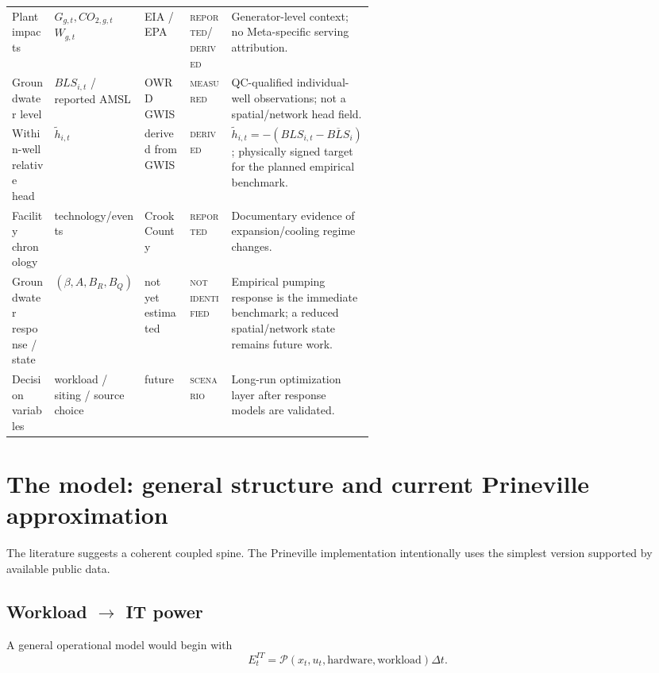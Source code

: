 \documentclass[11pt]{article}
\newcommand{\Reported}{\textsc{reported}}
\newcommand{\Measured}{\textsc{measured}}
\newcommand{\Derived}{\textsc{derived}}
\newcommand{\Scenario}{\textsc{scenario}}
\newcommand{\NotIdentified}{\textsc{not identified}}
\begin{document}
\begin{center}
\begin{tabularx}{\linewidth}{@{}p{0.13\linewidth}p{0.13\linewidth}p{0.14\linewidth}p{0.13\linewidth}Y@{}}
Plant impacts & \(G_{g,t},CO_{2,g,t}\)\newline \(W_{g,t}\) & EIA / EPA & \Reported / \Derived & Generator-level context; no Meta-specific serving attribution. \\
Groundwater level & \(BLS_{i,t}\) / reported AMSL & OWRD GWIS & \Measured & QC-qualified individual-well observations; not a spatial/network head field. \\
Within-well relative head & \(\tilde h_{i,t}\) & derived from GWIS & \Derived & \(\tilde h_{i,t}=-(BLS_{i,t}-\overline{BLS}_i)\); physically signed target for the planned empirical benchmark. \\
Facility chronology & technology/events & Crook County & \Reported & Documentary evidence of expansion/cooling regime changes. \\
Groundwater response / state & \((\beta,A,B_R,B_Q)\) & not yet estimated & \NotIdentified & Empirical pumping response is the immediate benchmark; a reduced spatial/network state remains future work. \\
Decision variables & workload / siting / source choice & future & \Scenario & Long-run optimization layer after response models are validated. \\
\bottomrule
\end{tabularx}
\par{}\end{center}

\section{The model: general structure and current Prineville approximation}

The literature suggests a coherent coupled spine. The Prineville implementation intentionally uses the simplest version supported by available public data.

\subsection[Workload to IT power]{Workload \(\rightarrow\) IT power}

A general operational model would begin with
\[
E^{IT}_{t}
=
\mathcal P(x_t,u_t,\text{hardware},\text{workload})\Delta t.
\]
\end{document}
